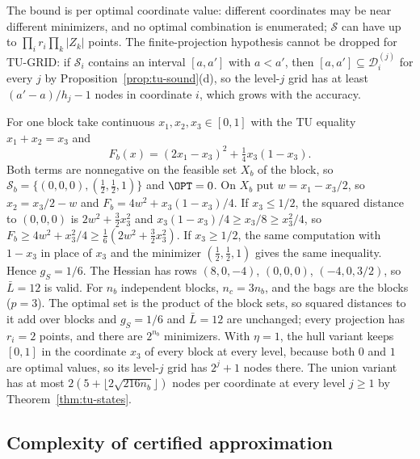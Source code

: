 The bound is per optimal coordinate value: different coordinates may be
near different minimizers, and no optimal combination is enumerated;
$\mathcal S$ can have up to $\prod_ir_i\prod_k\lvert Z_k\rvert$ points. The
finite-projection hypothesis cannot be dropped for TU-GRID: if $\mathcal S_i$
contains an interval $[a,a']$ with $a<a'$, then
$[a,a']\subseteq\mathcal D^{(j)}_i$ for every $j$ by
Proposition~\ref{prop:tu-sound}(d), so the level-$j$ grid has at least
$(a'-a)/h_j-1$ nodes in coordinate $i$, which grows with the accuracy.

\begin{example}\label{ex:tu-union}
For one block take continuous $x_1,x_2,x_3\in[0,1]$ with the TU equality
$x_1+x_2=x_3$ and
\[
F_b(x)=(2x_1-x_3)^2+\tfrac14x_3(1-x_3).
\]
Both terms are nonnegative on the feasible set $X_b$ of the block, so
$\mathcal S_b=\{(0,0,0),(\tfrac12,\tfrac12,1)\}$ and $\OPT=0$. On $X_b$ put
$w=x_1-x_3/2$, so $x_2=x_3/2-w$ and $F_b=4w^2+x_3(1-x_3)/4$. If $x_3\le1/2$,
the squared distance to $(0,0,0)$ is $2w^2+\frac32x_3^2$ and
$x_3(1-x_3)/4\ge x_3/8\ge x_3^2/4$, so
$F_b\ge4w^2+x_3^2/4\ge\frac16(2w^2+\frac32x_3^2)$. If $x_3\ge1/2$, the same
computation with $1-x_3$ in place of $x_3$ and the minimizer
$(\frac12,\frac12,1)$ gives the same inequality. Hence $g_S=1/6$. The Hessian
has rows $(8,0,-4)$, $(0,0,0)$, $(-4,0,3/2)$, so $\bar L=12$ is valid. For $n_b$
independent blocks, $n_c=3n_b$, and the bags are the blocks ($p=3$). The
optimal set is the product of the block sets, so squared distances to it add
over blocks and $g_S=1/6$ and $\bar L=12$ are unchanged; every projection has
$r_i=2$ points, and there are $2^{n_b}$ minimizers. With $\eta=1$, the hull
variant keeps $[0,1]$ in the coordinate $x_3$ of every block at every level,
because both $0$ and $1$ are optimal values, so its level-$j$ grid has
$2^j+1$ nodes there.
The union variant has at most $2(5+\lfloor2\sqrt{216n_b}\rfloor)$ nodes per
coordinate at every level $j\ge1$ by Theorem~\ref{thm:tu-states}.
\end{example}

\subsection{Complexity of certified approximation}\label{sec:tu-complexity}

